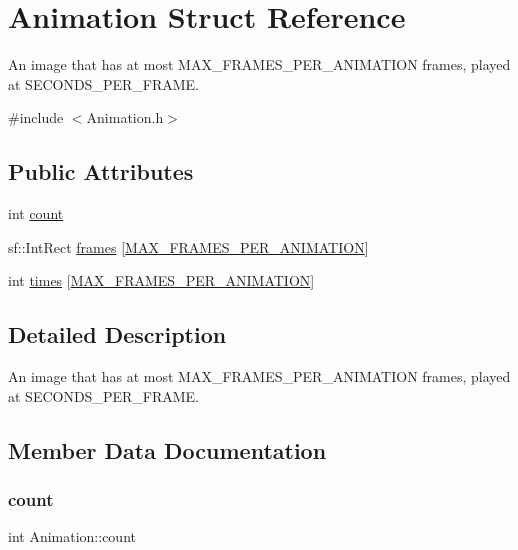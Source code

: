 \hypertarget{struct_animation}{}\section{Animation Struct Reference}
\label{struct_animation}


An image that has at most M\+A\+X\+\_\+\+F\+R\+A\+M\+E\+S\+\_\+\+P\+E\+R\+\_\+\+A\+N\+I\+M\+A\+T\+I\+ON frames, played at S\+E\+C\+O\+N\+D\+S\+\_\+\+P\+E\+R\+\_\+\+F\+R\+A\+ME.  




{\ttfamily \#include $<$Animation.\+h$>$}

\subsection*{Public Attributes}
\begin{DoxyCompactItemize}
\item 
int \hyperlink{struct_animation_a988e8e0d532dd6b3d581cac9447568ea}{count}
\item 
sf\+::\+Int\+Rect \hyperlink{struct_animation_aa7b68d6cf873a92e2179b618379e3e8c}{frames} \mbox{[}\hyperlink{_animation_8h_aefcfbff62033a5293157520b346713fb}{M\+A\+X\+\_\+\+F\+R\+A\+M\+E\+S\+\_\+\+P\+E\+R\+\_\+\+A\+N\+I\+M\+A\+T\+I\+ON}\mbox{]}
\item 
int \hyperlink{struct_animation_a3ba00e5e751106d59653fb6aaed2273a}{times} \mbox{[}\hyperlink{_animation_8h_aefcfbff62033a5293157520b346713fb}{M\+A\+X\+\_\+\+F\+R\+A\+M\+E\+S\+\_\+\+P\+E\+R\+\_\+\+A\+N\+I\+M\+A\+T\+I\+ON}\mbox{]}
\end{DoxyCompactItemize}


\subsection{Detailed Description}
An image that has at most M\+A\+X\+\_\+\+F\+R\+A\+M\+E\+S\+\_\+\+P\+E\+R\+\_\+\+A\+N\+I\+M\+A\+T\+I\+ON frames, played at S\+E\+C\+O\+N\+D\+S\+\_\+\+P\+E\+R\+\_\+\+F\+R\+A\+ME. 

\subsection{Member Data Documentation}
\mbox{\label{struct_animation_a988e8e0d532dd6b3d581cac9447568ea}} 
\subsubsection{\texorpdfstring{count}{count}}
{\footnotesize\ttfamily int Animation\+::count}

